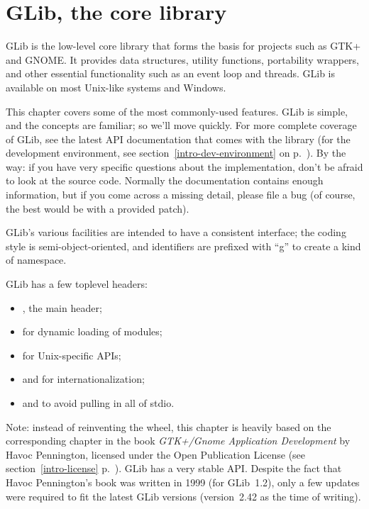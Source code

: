 \chapter{GLib, the core library}

GLib is the low-level core library that forms the basis for projects such as GTK+ and GNOME. It provides data structures, utility functions, portability wrappers, and other essential functionality such as an event loop and threads. GLib is available on most Unix-like systems and Windows.

This chapter covers some of the most commonly-used features. GLib is simple, and the concepts are familiar; so we'll move quickly. For more complete coverage of GLib, see the latest API documentation that comes with the library (for the development environment, see section~\ref{intro-dev-environment} on p.~\pageref{intro-dev-environment}). By the way: if you have very specific questions about the implementation, don't be afraid to look at the source code. Normally the documentation contains enough information, but if you come across a missing detail, please file a bug (of course, the best would be with a provided patch).

GLib's various facilities are intended to have a consistent interface; the coding style is semi-object-oriented, and identifiers are prefixed with ``g'' to create a kind of namespace.

GLib has a few toplevel headers:
\begin{itemize}
  \item {}, the main header;
  \item {} for dynamic loading of modules;
  \item {} for Unix-specific APIs;
  \item {} and  for internationalization;
  \item {} and  to avoid pulling in all of stdio.
\end{itemize}

\bigskip
Note: instead of reinventing the wheel, this chapter is heavily based on the corresponding chapter in the book \emph{GTK+/Gnome Application Development} by Havoc Pennington, licensed under the Open Publication License (see section~\ref{intro-license} p.~\pageref{intro-license}). GLib has a very stable API. Despite the fact that Havoc Pennington's book was written in 1999 (for GLib~1.2), only a few updates were required to fit the latest GLib versions (version~2.42 as the time of writing).

